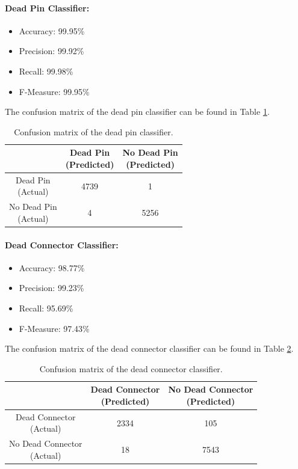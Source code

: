 \paragraph{Dead Pin Classifier:}
\begin{itemize}
  \item Accuracy: 99.95\%
  \item Precision: 99.92\%
  \item Recall: 99.98\%
  \item F-Measure: 99.95\%
\end{itemize}
The confusion matrix of the dead pin classifier can be found in Table
\ref{tbl:confusion-pin}.
\begin{table}[h]
  \centering
  \renewcommand\theadfont{\bfseries}
  \begin{tabular}{|c|c|c|}
    \hline
    & \thead{Dead Pin\\(Predicted)} & \thead{No Dead Pin\\(Predicted)} \\
    \hline
    \thead{Dead Pin\\(Actual)} & 4739 & 1\\
    \hline
    \thead{No Dead Pin\\(Actual)} & 4 & 5256\\
    \hline
  \end{tabular}
  \caption{Confusion matrix of the dead pin classifier.}
  \label{tbl:confusion-pin}
\end{table}

\paragraph{Dead Connector Classifier:}
\begin{itemize}
  \item Accuracy: 98.77\%
  \item Precision: 99.23\%
  \item Recall: 95.69\%
  \item F-Measure: 97.43\%
\end{itemize}
The confusion matrix of the dead connector classifier can be found in
Table \ref{tbl:confusion-connector}.
\begin{table}[h]
  \centering
  \renewcommand\theadfont{\bfseries}
  \begin{tabular}{|c|c|c|}
    \hline
    & \thead{Dead Connector\\(Predicted)} & \thead{No Dead Connector\\(Predicted)} \\
    \hline
    \thead{Dead Connector\\(Actual)} & 2334 & 105\\
    \hline
    \thead{No Dead Connector\\(Actual)} & 18 & 7543\\
    \hline
  \end{tabular}
  \caption{Confusion matrix of the dead connector classifier.}
  \label{tbl:confusion-connector}
\end{table}

